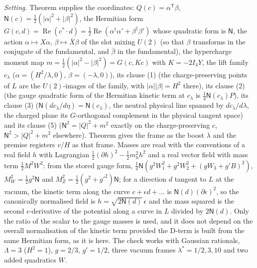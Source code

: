 \emph{Setting.} Theorem  supplies the coordinates: $Q(c) = \alpha^{\mathsf T}\beta$, $\mathsf{N}(c) = \tfrac12(|\alpha|^{2} + |\beta|^{2})$, the Hermitian form $G(c, d) = \operatorname{Re}(c^{*}\cdot d) = \tfrac12\operatorname{Re}(\alpha^{\dagger}\alpha' + \beta^{\dagger}\beta')$ whose quadratic form is $\mathsf{N}$, the action $\alpha \mapsto X\alpha$, $\beta \mapsto \bar{X}\beta$ of the slot mixing $U(2)$ (so that $\beta$ transforms in the conjugate of the fundamental, and $\bar{\beta}$ in the fundamental), the hypercharge moment map $m = \tfrac12(|\alpha|^{2} - |\beta|^{2}) = G(c, Kc)$ with $K = -2I_{4}Y$, the lift family $c_{\lambda}$ ($\alpha = (H^{2}/\lambda, 0)$, $\beta = (-\lambda, 0)$), its clause (1) (the charge-preserving points of $L$ are the $U(2)$-images of the family, with $|\alpha||\beta| = H^{2}$ there), its clause (2) (the gauge quadratic form of the Hermitian kinetic term at $c_{\lambda}$ is $\tfrac14 \mathsf{N}(c_{\lambda})P$), its clause (3) ($\mathsf{N}(dc_{\lambda}/d\eta) = \mathsf{N}(c_{\lambda})$, the neutral physical line spanned by $dc_{\lambda}/d\lambda$, the charged plane its $G$-orthogonal complement in the physical tangent space) and its clause (5) ($\mathsf{N}^{2} = |Q|^{2} + m^{2}$ exactly on the charge-preserving $c$, $\mathsf{N}^{2} > |Q|^{2} + m^{2}$ elsewhere). Theorem  gives the frame as the boost $\lambda$ and the premise  registers $v/H$ as that frame. Masses are read with the conventions of a real field $h$ with Lagrangian $\tfrac12(\partial h)^{2} - \tfrac12 m_{h}^{2}h^{2}$ and a real vector field with mass term $\tfrac12 M^{2}W^{2}$: from the stored gauge form, $\tfrac14 \mathsf{N}(g^{2}W_{1}^{2} + g^{2}W_{2}^{2} + (gW_{3} + g'B)^{2})$, $M_{W}^{2} = \tfrac12 g^{2}\mathsf{N}$ and $M_{Z}^{2} = \tfrac12(g^{2} + g'^{2})\mathsf{N}$; for a direction $d$ tangent to $L$ at the vacuum, the kinetic term along the curve $c + \epsilon d + \dots$ is $\mathsf{N}(d)(\partial\epsilon)^{2}$, so the canonically normalised field is $h = \sqrt{2\mathsf{N}(d)}\,\epsilon$ and the mass squared is the second $\epsilon$-derivative of the potential along a curve in $L$ divided by $2\mathsf{N}(d)$. Only the ratio of the scalar to the gauge masses is used, and it does not depend on the overall normalisation of the kinetic term provided the D-term is built from the same Hermitian form, as it is here. The check works with Gaussian rationals, $\Lambda = 3$ ($H^{2} = 1$), $g = 2/3$, $g' = 1/2$, three vacuum frames $\lambda^{*} = 1/2, 3, 10$ and two added quadratics $W$.

